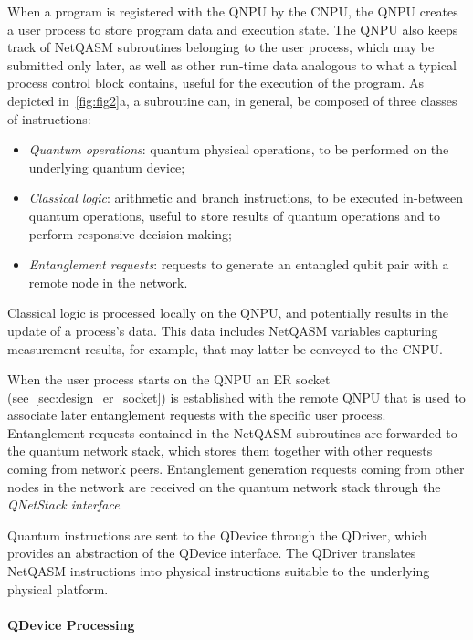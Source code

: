 When a program is registered with the \ac{QNPU} by the \ac{CNPU}, the \ac{QNPU} creates a user process to store program data and execution state. The \ac{QNPU} also keeps track of \ac{NetQASM} subroutines belonging to the user process, which may be submitted only later, as well as other run-time data analogous to what a typical process control block contains, useful for the execution of the program. As depicted in~\cref{fig:fig2}a, a subroutine can, in general, be composed of three classes of instructions:

\begin{itemize}
\item \emph{Quantum operations}: quantum physical operations, to be performed on the underlying quantum device;
\item \emph{Classical logic}: arithmetic and branch instructions, to be executed in-between quantum operations, useful to store results of quantum operations and to perform responsive decision-making;
\item \emph{Entanglement requests}: requests to generate an entangled qubit pair with a remote node in the network.
\end{itemize}
%
Classical logic is processed locally on the \ac{QNPU}, and potentially results in the update of a process's data. This data includes \ac{NetQASM} variables capturing measurement results, for example, that may latter be conveyed to the \ac{CNPU}. 

When the user process starts on the \ac{QNPU} an \ac{ER} socket (see~\cref{sec:design_er_socket}) is established with the remote \ac{QNPU} that is used to associate later entanglement requests with the specific user process. Entanglement requests contained in the \ac{NetQASM} subroutines are forwarded to the quantum network stack,  which stores them together with other requests coming from network peers. Entanglement generation requests coming from other nodes in the network are received on the quantum network stack through the \emph{\ac{QNetStack} interface}.

Quantum instructions are sent to the \ac{QDevice} through the \ac{QDriver}, which provides an abstraction of the \ac{QDevice} interface. The \ac{QDriver} translates \ac{NetQASM} instructions into physical instructions suitable to the underlying physical platform.

\paragraph{QDevice Processing}


